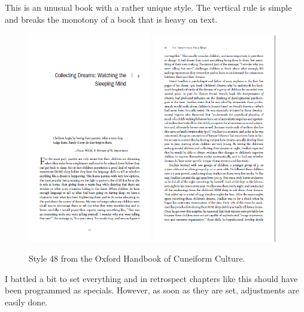 This is an unusual book with a rather unique style. The vertical rule is simple and breaks the monotony of a book that is heavy on text.
\begin{figure}[ht]
\includegraphics[width=0.48\textwidth]{./chapters/chapter49}\hfill
\includegraphics[width=0.48\textwidth]{./chapters/chapter49a}
\caption{Style 48 from the Oxford Handbook of Cuneiform Culture.}
\end{figure}

I battled a bit to set everything and in retrospect chapters like this should have been programmed as specials. However, as soon as they are set, adjustments are easily done.



